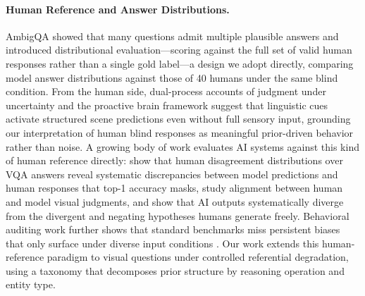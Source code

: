 \paragraph{Human Reference and Answer Distributions.}
AmbigQA \citep{min2020ambigqa} showed that many questions admit multiple plausible
answers and introduced distributional evaluation---scoring against the full set of
valid human responses rather than a single gold label---a design we adopt directly,
comparing model answer distributions against those of 40 humans under the same blind condition.
From the human side, dual-process accounts of judgment under uncertainty
\citep{tversky1974judgment,kahneman2011thinking} and the proactive brain framework
\citep{bar2007proactive} suggest that linguistic cues activate structured scene
predictions even without full sensory input, grounding our interpretation of human
blind responses as meaningful prior-driven behavior rather than noise.
A growing body of work evaluates AI systems against this kind of human reference
directly: \citet{lan2025mind} show that human disagreement distributions over VQA answers
reveal systematic discrepancies between model predictions and human responses
that top-1 accuracy masks, \citet{lee2023visalign} study alignment between human and model visual
judgments, and \citet{bao2026imagination} show that AI outputs systematically diverge
from the divergent and negating hypotheses humans generate freely.
Behavioral auditing work further shows that standard benchmarks miss persistent
biases that only surface under diverse input conditions
\citep{rottger2025safetyprompts,kwon2025whatllms}.
Our work extends this human-reference paradigm to visual questions under controlled
referential degradation, using a taxonomy that decomposes prior structure by
reasoning operation and entity type.


